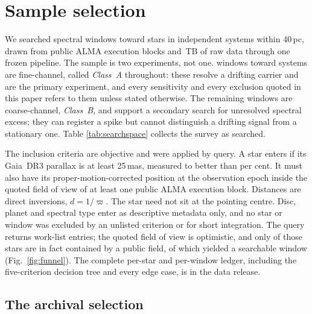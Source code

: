 \section{Sample selection}
\label{sec:sample}

We searched \NWindows{} spectral windows toward \NStars{} stars in
\NSystems{} independent systems within 40\,pc, drawn from \NEB{} public
ALMA execution blocks and \TotalDataTB\,TB of raw data through one frozen
pipeline. The sample is two experiments, not one. \NWinA{} windows toward
\NSysClassA{} systems are fine-channel, called \emph{Class~A} throughout:
these resolve a drifting carrier and are the primary experiment, and
every sensitivity and every exclusion quoted in this paper refers to them
unless stated otherwise. The remaining \NWinB{} windows are
coarse-channel, \emph{Class~B}, and support a secondary search for
unresolved spectral excess; they can register a spike but cannot
distinguish a drifting signal from a stationary one. Table
\ref{tab:searchspace} collects the survey as searched.

The inclusion criteria are objective and were applied by query. A star
enters if its Gaia~DR3 parallax is at least 25\,mas, measured to better
than \PlxAdqlPct{} per cent. It must also have its proper-motion-corrected
position at the observation epoch inside the quoted field of view of at
least one public ALMA execution block. Distances are direct inversions,
$d=1/\varpi$. The star need not sit at the pointing centre. Disc, planet
and spectral type enter as descriptive metadata only, and no star or
window was excluded by an unlisted criterion or for short integration.
The query returns \NCensus{} work-list entries; the quoted field of view
is optimistic, and only \NGenuinelyCovered{} of those stars are in fact
contained by a public field, of which \NStars{} yielded a searchable
window (Fig.~\ref{fig:funnel}). The complete per-star and per-window
ledger, including the five-criterion decision tree and every edge case,
is in the data release.

\subsection{The archival selection}
\label{sec:bias}

